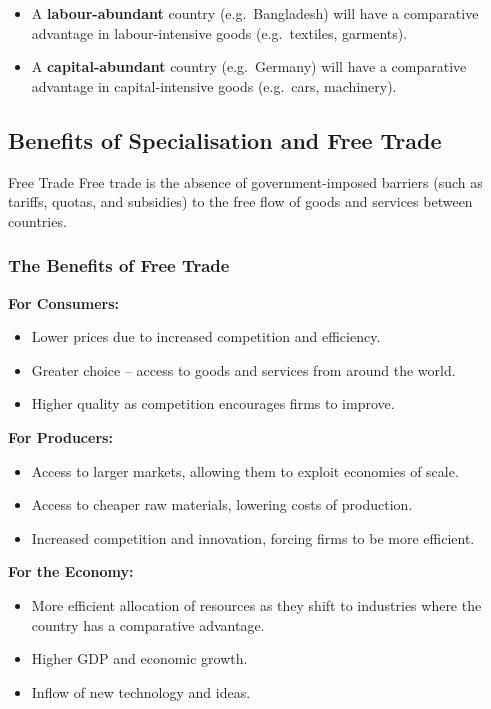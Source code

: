 \documentclass[11pt, a4paper, twoside]{book}
\begin{document}
\begin{itemize}
  \item A \textbf{labour-abundant} country (e.g.\ Bangladesh) will have a comparative advantage in labour-intensive goods (e.g.\ textiles, garments).
  \item A \textbf{capital-abundant} country (e.g.\ Germany) will have a comparative advantage in capital-intensive goods (e.g.\ cars, machinery).
\end{itemize}

\subsection{Benefits of Specialisation and Free Trade}

\begin{keyterm}{Free Trade}
Free trade is the absence of government-imposed barriers (such as tariffs, quotas, and subsidies) to the free flow of goods and services between countries.
\end{keyterm}

\subsubsection{The Benefits of Free Trade}

\textbf{For Consumers:}
\begin{itemize}
  \item Lower prices due to increased competition and efficiency.
  \item Greater choice -- access to goods and services from around the world.
  \item Higher quality as competition encourages firms to improve.
\end{itemize}

\textbf{For Producers:}
\begin{itemize}
  \item Access to larger markets, allowing them to exploit economies of scale.
  \item Access to cheaper raw materials, lowering costs of production.
  \item Increased competition and innovation, forcing firms to be more efficient.
\end{itemize}

\textbf{For the Economy:}
\begin{itemize}
  \item More efficient allocation of resources as they shift to industries where the country has a comparative advantage.
  \item Higher GDP and economic growth.
  \item Inflow of new technology and ideas.
\end{itemize}
\end{document}
